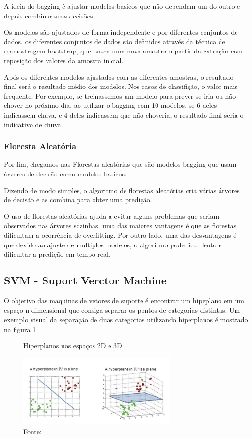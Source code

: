 \documentclass[12pt,a4paper]{article}
\begin{document}
A ideia do bagging é ajustar modelos basicos que não dependam um do outro e depois combinar suas decisões.

Os modelos são ajustados de forma independente e por diferentes conjuntos de dados. os diferentes conjuntos de dados são definidos através da técnica de reamostragem bootstrap, que busca uma nova amostra a partir da extração com reposição dos valores da amostra inicial.

Após os diferentes modelos ajustados com as diferentes amostras, o resultado final será o resultado médio dos modelos. Nos casos de classifição, o valor mais frequente. Por exemplo, se treinassemos um modelo para prever se iria ou não chover no próximo dia, ao utilizar o bagging com 10 modelos, se 6 deles indicassem chuva, e 4 deles indicassem que não choveria, o resultado final seria o indicativo de chuva.


\subsubsection{Floresta Aleatória}


Por fim, chegamos nas Florestas aleatórias que são modelos bagging que usam árvores de decisão como modelos basicos.

Dizendo de modo simples, o algoritmo de florestas aleatórias cria várias árvores de decisão e as combina para obter uma predição.

O uso de florestas aleatórias ajuda a evitar alguns problemas que seriam observados nas árvores sozinhas, uma das maiores vantagens é que as  florestas dificultam a ocorrência de overfitting. Por outro lado, uma das desvantagens é que devido ao ajuste de multiplos modelos, o algoritmo pode ficar lento e dificultar a predição em tempo real.

\subsection{SVM - Suport Verctor Machine}
O objetivo das maquinas de vetores de suporte é encontrar um hipeplano em um espaço n-dimensional que consiga separar os pontos de categorias distintas. Um exemplo visual da separação de duas categorias utilizando  hiperplanos é mostrado na figura \ref{fig: hiperplanes}

\begin{figure}[ht]
\centering
\caption{Hiperplanos nos espaços 2D e 3D}
  \includegraphics[width=8cm]{"images/hiperplaneExample.png"}
  \centering
\caption*{Fonte: }%
\label{fig: hiperplanes}
\end{figure} 
\end{document}
